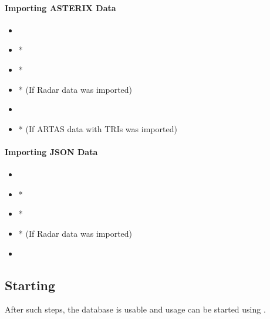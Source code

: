 \paragraph{Importing ASTERIX Data} 

\begin{itemize}
 \item {}
 \item {}*
 \item {}*
 \item {}* (If Radar data was imported)
 \item {}
 \item {}* (If ARTAS data with TRIs was imported)
\end{itemize}

\paragraph{Importing JSON Data} 

\begin{itemize}
 \item {}
 \item {}*
 \item {}*
 \item {}* (If Radar data was imported)
 \item {}
\end{itemize}

\subsection{Starting}
After such steps, the database is usable and usage can be started using .
